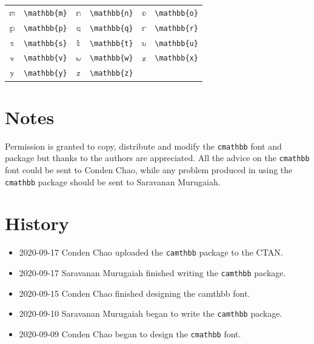 \documentclass[oneside,a4paper]{article}
\begin{document}
\begin{longtable}{cccccc}
		$\mathbb{m}$&\verb|\mathbb{m}|&$\mathbb{n}$&\verb|\mathbb{n}|&$\mathbb{o}$&\verb|\mathbb{o}|\\
		$\mathbb{p}$&\verb|\mathbb{p}|&		$\mathbb{q}$&\verb|\mathbb{q}|&$\mathbb{r}$&\verb|\mathbb{r}|\\
		$\mathbb{s}$&\verb|\mathbb{s}|&$\mathbb{t}$&\verb|\mathbb{t}|&		$\mathbb{u}$&\verb|\mathbb{u}|\\
		$\mathbb{v}$&\verb|\mathbb{v}|&$\mathbb{w}$&\verb|\mathbb{w}|&$\mathbb{x}$&\verb|\mathbb{x}| \\
		$\mathbb{y}$&\verb|\mathbb{y}|&$\mathbb{z}$&\verb|\mathbb{z}|&&\\\hline
	\end{longtable}

\section{Notes}

Permission is granted to copy, distribute and modify the \verb|cmathbb| font and package but thanks to the authors are appreciated. All the advice on the \verb|cmathbb| font could be sent to Conden Chao, while any problem produced in using the \verb|cmathbb| package should be sent to Saravanan Murugaiah.

\section{History}

\begin{itemize}
	\item 2020-09-17 Conden Chao uploaded the \verb|camthbb| package to the CTAN.
	\item 2020-09-17 Saravanan Murugaiah finished writing the \verb|camthbb| package.
	\item 2020-09-15 Conden Chao finished designing the camthbb font.
	\item  2020-09-10 Saravanan Murugaiah began to write the \verb|camthbb| package.
	\item 2020-09-09 Conden Chao began to design the \verb|cmathbb| font.
\end{itemize}
\end{document}

